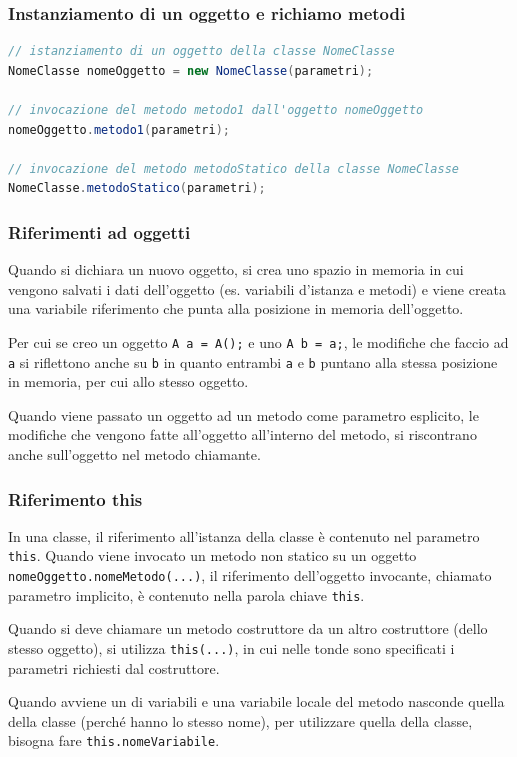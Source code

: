 \documentclass{article}
\begin{document}
\subsubsection*{Instanziamento di un oggetto e richiamo metodi}
\begin{lstlisting}[language=Java]
// istanziamento di un oggetto della classe NomeClasse
NomeClasse nomeOggetto = new NomeClasse(parametri);

// invocazione del metodo metodo1 dall'oggetto nomeOggetto
nomeOggetto.metodo1(parametri);

// invocazione del metodo metodoStatico della classe NomeClasse
NomeClasse.metodoStatico(parametri);
\end{lstlisting}

\subsubsection*{Riferimenti ad oggetti}
Quando si dichiara un nuovo oggetto, si crea uno spazio in memoria in cui vengono salvati i dati dell'oggetto (es. variabili
d'istanza e metodi) e viene creata una variabile riferimento che punta alla posizione in memoria dell'oggetto.

Per cui se creo un oggetto \verb|A a = A();| e uno \verb|A b = a;|, le modifiche che faccio ad \verb|a| si riflettono anche
su \verb|b| in quanto entrambi \verb|a| e \verb|b| puntano alla stessa posizione in memoria, per cui allo stesso oggetto.

Quando viene passato un oggetto ad un metodo come parametro esplicito, le modifiche che vengono fatte all'oggetto all'interno
del metodo, si riscontrano anche sull'oggetto nel metodo chiamante.

\subsubsection*{Riferimento this}
In una classe, il riferimento all'istanza della classe è contenuto nel parametro \verb|this|. Quando viene invocato un metodo
non statico su un oggetto \verb|nomeOggetto.nomeMetodo(...)|, il riferimento dell'oggetto invocante, chiamato parametro implicito, 
è contenuto nella parola chiave \verb|this|.

Quando si deve chiamare un metodo costruttore da un altro costruttore (dello stesso oggetto), si utilizza \verb|this(...)|, in cui
nelle tonde sono specificati i parametri richiesti dal costruttore.

Quando avviene un  di variabili e una variabile locale del metodo nasconde quella della classe (perché hanno lo
stesso nome), per utilizzare quella della classe, bisogna fare \verb|this.nomeVariabile|.
\end{document}
